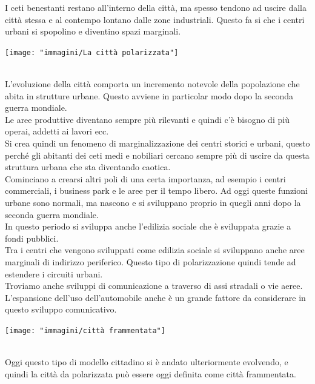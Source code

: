 \documentclass[a4paper,12pt, oneside]{book}
\begin{document}
  I ceti benestanti restano all'interno della città, ma spesso tendono ad uscire dalla città stessa e al contempo lontano dalle zone industriali. Questo fa si che i centri urbani si spopolino e diventino spazi marginali.\\
  \begin{center}
  	\texttt{[image: "immagini/La città polarizzata"]}
  	\label{fig:La città polarizzata}
  \end{center}
  \leavevmode\\
  L'evoluzione della città comporta un incremento notevole della popolazione che abita in strutture urbane. Questo avviene in particolar modo dopo la seconda guerra mondiale.\\
  Le aree produttive diventano sempre più rilevanti e quindi c'è bisogno di più operai, addetti ai lavori ecc.\\
  Si crea quindi un fenomeno di marginalizzazione dei centri storici e urbani, questo perché gli abitanti dei ceti medi e nobiliari cercano sempre più di uscire da questa struttura urbana che sta diventando caotica.\\
  Cominciano a crearsi altri poli di una certa importanza, ad esempio i centri commerciali, i business park e le aree per il tempo libero. Ad oggi queste funzioni urbane sono normali, ma nascono e si sviluppano proprio in quegli anni dopo la seconda guerra mondiale.\\
  In questo periodo si sviluppa anche l'edilizia sociale che è sviluppata grazie a fondi pubblici.\\
  Tra i centri che vengono sviluppati come edilizia sociale si sviluppano anche aree marginali di indirizzo periferico. Questo tipo di polarizzazione quindi tende ad estendere i circuiti urbani.\\
  Troviamo anche sviluppi di comunicazione a traverso di assi stradali o vie aeree. L'espansione dell'uso dell'automobile anche è un grande fattore da considerare in questo sviluppo comunicativo.\\
  \begin{center}
  	\texttt{[image: "immagini/città frammentata"]}
  	\label{fig:città frammentata}
  \end{center}
  \leavevmode\\
  Oggi questo tipo di modello cittadino si è andato ulteriormente evolvendo, e quindi la città da polarizzata può essere oggi definita come città frammentata.\\
\end{document}
